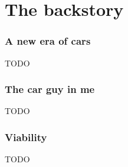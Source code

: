 \part{The backstory}
\label{part:backstory}


\section{A new era of cars}
\label{sec:new_era}

TODO


\section{The car guy in me}
\label{sec:carguy}

TODO


\section{Viability}
\label{sec:viability}

TODO

